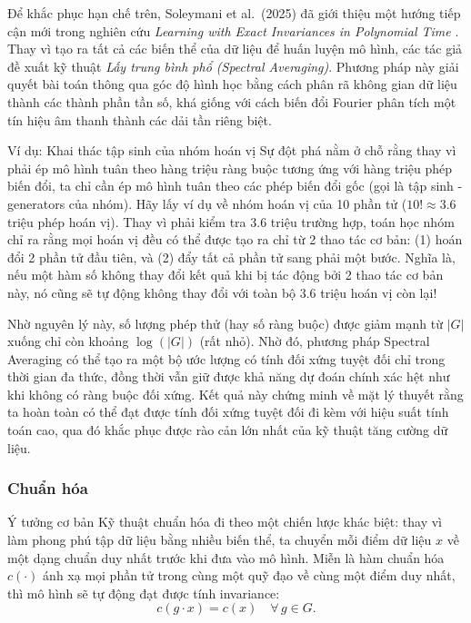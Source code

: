 Để khắc phục hạn chế trên, Soleymani et al.\ (2025) đã giới thiệu một hướng tiếp cận mới trong nghiên cứu \textit{Learning with Exact Invariances in Polynomial Time} \cite{soleymani2025learning}. Thay vì tạo ra tất cả các biến thể của dữ liệu để huấn luyện mô hình, các tác giả đề xuất kỹ thuật \textit{Lấy trung bình phổ (Spectral Averaging)}. Phương pháp này giải quyết bài toán thông qua góc độ hình học bằng cách phân rã không gian dữ liệu thành các thành phần tần số, khá giống với cách biến đổi Fourier phân tích một tín hiệu âm thanh thành các dải tần riêng biệt.


\begin{examplebox}{Ví dụ: Khai thác tập sinh của nhóm hoán vị}
Sự đột phá nằm ở chỗ rằng thay vì phải ép mô hình tuân theo hàng triệu ràng buộc tương ứng với hàng triệu phép biến đổi, ta chỉ cần ép mô hình tuân theo các phép biến đổi gốc (gọi là tập sinh - generators của nhóm). Hãy lấy ví dụ về nhóm hoán vị của 10 phần tử ($10! \approx 3.6$ triệu phép hoán vị). Thay vì phải kiểm tra $3.6$ triệu trường hợp, toán học nhóm chỉ ra rằng mọi hoán vị đều có thể được tạo ra chỉ từ 2 thao tác cơ bản: (1) hoán đổi 2 phần tử đầu tiên, và (2) đẩy tất cả phần tử sang phải một bước. Nghĩa là, nếu một hàm số không thay đổi kết quả khi bị tác động bởi 2 thao tác cơ bản này, nó cũng sẽ tự động không thay đổi với toàn bộ $3.6$ triệu hoán vị còn lại!
\end{examplebox}

Nhờ nguyên lý này, số lượng phép thử (hay số ràng buộc) được giảm mạnh từ $|G|$ xuống chỉ còn khoảng $\log(|G|)$ (rất nhỏ). Nhờ đó, phương pháp Spectral Averaging có thể tạo ra một bộ ước lượng có tính đối xứng tuyệt đối chỉ trong thời gian đa thức, đồng thời vẫn giữ được khả năng dự đoán chính xác hệt như khi không có ràng buộc đối xứng. Kết quả này chứng minh về mặt lý thuyết rằng ta hoàn toàn có thể đạt được tính đối xứng tuyệt đối đi kèm với hiệu suất tính toán cao, qua đó khắc phục được rào cản lớn nhất của kỹ thuật tăng cường dữ liệu.


\subsubsection{Chuẩn hóa}
\label{subsubsec:canonicalization}

\begin{infobox}{Ý tưởng cơ bản}
Kỹ thuật chuẩn hóa đi theo một chiến lược khác biệt: thay vì làm phong phú tập dữ liệu bằng nhiều biến thể, ta chuyển mỗi điểm dữ liệu $x$ về một dạng chuẩn duy nhất trước khi đưa vào mô hình. Miễn là hàm chuẩn hóa $c(\cdot)$ ánh xạ mọi phần tử trong cùng một quỹ đạo về cùng một điểm duy nhất, thì mô hình sẽ tự động đạt được tính invariance:
\begin{equation}
    c(g \cdot x) = c(x) \quad \forall\, g \in G.
\end{equation}
\end{infobox}


